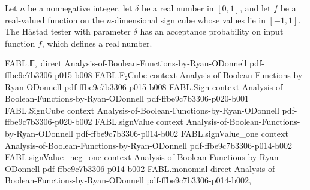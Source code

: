 \begin{definition}
\label{FABL.hastadAcceptanceProbability}
\leanok
{}
Let $n$ be a nonnegative integer, let $\delta$ be a real number in $[0,1]$, and let $f$ be a
real-valued function on the $n$-dimensional sign cube whose values lie in $[-1,1]$. The
Håstad tester with parameter $\delta$ has an acceptance probability on input function $f$,
which defines a real number.
\end{definition}

\begin{theorem}
\label{FABL.hastadAcceptanceProbability_eq_expect}
\leanok
{}
\proofstep
  {FABL.𝔽₂}
  {direct}
  {Analysis-of-Boolean-Functions-by-Ryan-ODonnell}
  {pdf-ffbe9c7b3306-p015-b008}
\proofstep
  {FABL.F₂Cube}
  {context}
  {Analysis-of-Boolean-Functions-by-Ryan-ODonnell}
  {pdf-ffbe9c7b3306-p015-b008}
\proofstep
  {FABL.Sign}
  {context}
  {Analysis-of-Boolean-Functions-by-Ryan-ODonnell}
  {pdf-ffbe9c7b3306-p020-b001}
\proofstep
  {FABL.SignCube}
  {context}
  {Analysis-of-Boolean-Functions-by-Ryan-ODonnell}
  {pdf-ffbe9c7b3306-p020-b002}
\proofstep
  {FABL.signValue}
  {context}
  {Analysis-of-Boolean-Functions-by-Ryan-ODonnell}
  {pdf-ffbe9c7b3306-p014-b002}
\proofstep
  {FABL.signValue_one}
  {context}
  {Analysis-of-Boolean-Functions-by-Ryan-ODonnell}
  {pdf-ffbe9c7b3306-p014-b002}
\proofstep
  {FABL.signValue_neg_one}
  {context}
  {Analysis-of-Boolean-Functions-by-Ryan-ODonnell}
  {pdf-ffbe9c7b3306-p014-b002}
\proofstep
  {FABL.monomial}
  {direct}
  {Analysis-of-Boolean-Functions-by-Ryan-ODonnell}
  {pdf-ffbe9c7b3306-p014-b002,
}
\end{theorem}
